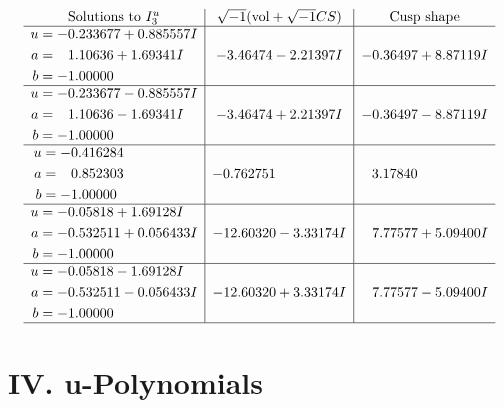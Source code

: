 \documentclass[1p]{elsarticle_modified}
\theoremstyle{definition}
\newcommand{\I}{\sqrt{-1}}
\begin{document}
$$\begin{array}{c|c|c}  
\text{Solutions to }I^u_{3}& \I (\text{vol} + \sqrt{-1}CS) & \text{Cusp shape}\\
 \hline 
\begin{aligned}
u &= -0.233677 + 0.885557 I \\
a &= \phantom{-}1.10636 + 1.69341 I \\
b &= -1.00000\phantom{ +0.000000I}\end{aligned}
 & -3.46474 - 2.21397 I & -0.36497 + 8.87119 I \\ \hline\begin{aligned}
u &= -0.233677 - 0.885557 I \\
a &= \phantom{-}1.10636 - 1.69341 I \\
b &= -1.00000\phantom{ +0.000000I}\end{aligned}
 & -3.46474 + 2.21397 I & -0.36497 - 8.87119 I \\ \hline\begin{aligned}
u &= -0.416284\phantom{ +0.000000I} \\
a &= \phantom{-}0.852303\phantom{ +0.000000I} \\
b &= -1.00000\phantom{ +0.000000I}\end{aligned}
 & -0.762751\phantom{ +0.000000I} & \phantom{-}3.17840\phantom{ +0.000000I} \\ \hline\begin{aligned}
u &= -0.05818 + 1.69128 I \\
a &= -0.532511 + 0.056433 I \\
b &= -1.00000\phantom{ +0.000000I}\end{aligned}
 & -12.60320 - 3.33174 I & \phantom{-}7.77577 + 5.09400 I \\ \hline\begin{aligned}
u &= -0.05818 - 1.69128 I \\
a &= -0.532511 - 0.056433 I \\
b &= -1.00000\phantom{ +0.000000I}\end{aligned}
 & -12.60320 + 3.33174 I & \phantom{-}7.77577 - 5.09400 I\\
 \hline 
 \end{array}$$\newpage
\newpage\renewcommand{\arraystretch}{1}
\centering \section*{ IV. u-Polynomials}
\end{document}
